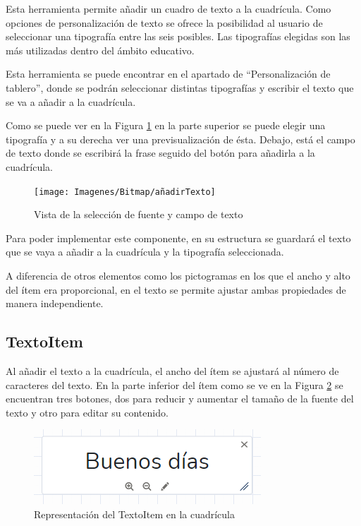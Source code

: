 Esta herramienta permite añadir un cuadro de texto a la cuadrícula. Como opciones de personalización de texto se ofrece la posibilidad al usuario de seleccionar una tipografía entre las seis posibles. Las tipografías elegidas son las más utilizadas dentro del ámbito educativo.

Esta herramienta se puede encontrar en el apartado de “Personalización de tablero”, donde se podrán seleccionar distintas tipografías y escribir el texto que se va a añadir a la cuadrícula.

Como se puede ver en la Figura \ref{fig:anadirtexto} en la parte superior se puede elegir una tipografía y a su derecha ver una previsualización de ésta. Debajo, está el campo de texto donde se escribirá la frase seguido del botón para añadirla a la cuadrícula.

\begin{figure}[h!]
	\centering
	\texttt{[image: Imagenes/Bitmap/añadirTexto]}
	\caption{Vista de la selección de fuente y campo de texto}
	\label{fig:anadirtexto}
\end{figure}


Para poder implementar este componente, en su estructura se guardará el texto que se vaya a añadir a la cuadrícula y la tipografía seleccionada.

A diferencia de otros elementos como los pictogramas en los que el ancho y alto del ítem era proporcional, en el texto se permite ajustar ambas propiedades de manera independiente.

\subsection{TextoItem}
\label{cap5:sec:texto}
Al añadir el texto a la cuadrícula, el ancho del ítem se ajustará al número de caracteres del texto. En la parte inferior del ítem como se ve en la Figura \ref{fig:fraseitem1} se encuentran tres botones, dos para reducir y aumentar el tamaño de la fuente del texto y otro para editar su contenido.

\begin{figure}[h!]
	\centering
	\includegraphics[width=0.7\linewidth]{Imagenes/Bitmap/fraseItem1}
	\caption{Representación del TextoItem en la cuadrícula}
	\label{fig:fraseitem1}
\end{figure}


